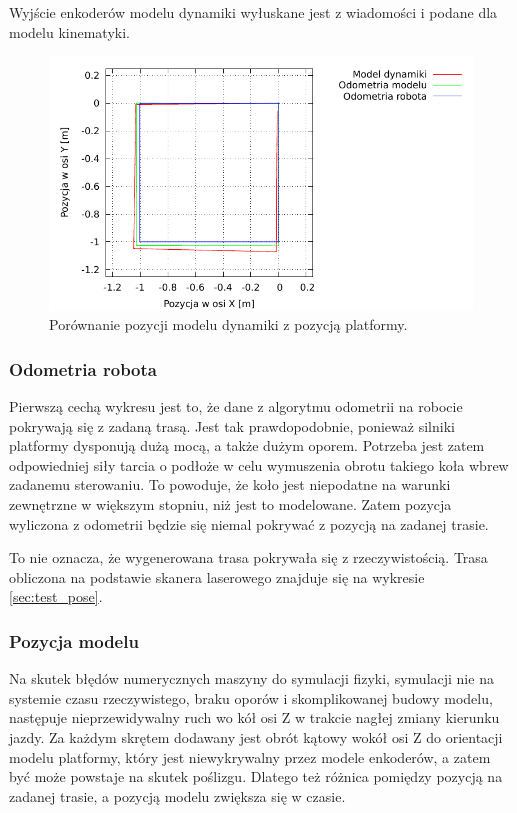 	Wyjście enkoderów modelu dynamiki wyłuskane jest z wiadomości i podane dla modelu kinematyki.
	
	\begin{figure}[H]
		\centering
		\includegraphics[width=\textwidth]{plots/odometry.pdf}
			\caption{Porównanie pozycji modelu dynamiki z pozycją platformy.}
		\label{plot:encoders}
	\end{figure}
	
	\subsubsection{Odometria robota}
		Pierwszą cechą wykresu jest to, że dane z algorytmu odometrii na robocie pokrywają się z zadaną trasą.
		Jest tak prawdopodobnie, ponieważ silniki platformy dysponują dużą mocą, a także dużym oporem.
		Potrzeba jest zatem odpowiedniej siły tarcia o podłoże w celu wymuszenia obrotu takiego koła wbrew zadanemu sterowaniu.
		To powoduje, że koło jest niepodatne na warunki zewnętrzne w większym stopniu, niż jest to modelowane.
		Zatem pozycja wyliczona z odometrii będzie się niemal pokrywać z pozycją na zadanej trasie.
		
		To nie oznacza, że wygenerowana trasa pokrywała się z rzeczywistością. Trasa obliczona na podstawie skanera laserowego znajduje się na wykresie \ref{sec:test_pose}.
		
	\subsubsection{Pozycja modelu}
		Na skutek błędów numerycznych maszyny do symulacji fizyki, symulacji nie na systemie czasu rzeczywistego, braku oporów i skomplikowanej budowy modelu, następuje
		nieprzewidywalny ruch wo kół osi Z w trakcie nagłej zmiany kierunku jazdy.
		Za każdym skrętem dodawany jest obrót kątowy wokół osi Z do orientacji modelu platformy, który jest niewykrywalny przez modele enkoderów, a zatem być może powstaje na skutek
		poślizgu.
		Dlatego też różnica pomiędzy pozycją na zadanej trasie, a pozycją modelu zwiększa się w czasie.
		
